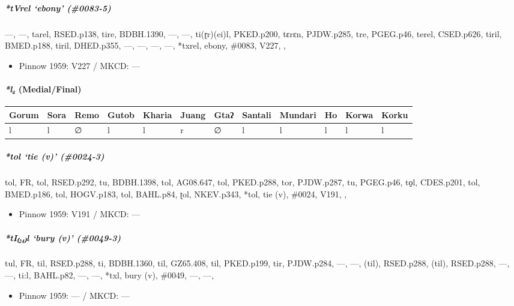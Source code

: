 \documentclass[a4paper,]{article}
\providecommand{\tightlist}{%
  \setlength{\itemsep}{0pt}\setlength{\parskip}{0pt}}
\let\oldparagraph\paragraph
\renewcommand{\paragraph}[1]{\oldparagraph{#1}\mbox{}}
\let\oldsubparagraph\subparagraph
\renewcommand{\subparagraph}[1]{\oldsubparagraph{#1}\mbox{}}
\begin{document}
\subparagraph{\texorpdfstring{\emph{*tVrel} `ebony'
(\#0083-5)}{*tVrel ebony (\#0083-5)}}\label{tvrel-ebony-0083-5}

---, ---, tarel, RSED.p138, tire, BDBH.1390, ---, ---, ti(ɽr)(ei)l,
PKED.p200, tɛrɛn, PJDW.p285, tre, PGEG.p46, terel, CSED.p626, tiril,
BMED.p188, tiril, DHED.p355, ---, ---, ---, ---, *txrel, ebony, \#0083,
V227, ,

\begin{itemize}
\tightlist
\item
  Pinnow 1959: V227 / MKCD: ---
\end{itemize}

\paragraph{\texorpdfstring{\emph{*l₄}
(Medial/Final)}{*l₄ (Medial/Final)}}\label{l-medialfinal-2}

\begin{longtable}[]{@{}llllllllllll@{}}
\toprule
Gorum & Sora & Remo & Gutob & Kharia & Juang & Gtaʔ & Santali & Mundari
& Ho & Korwa & Korku\tabularnewline
\midrule
\endhead
l & l & ∅ & l & l & r & ∅ & l & l & l & l & l\tabularnewline
\bottomrule
\end{longtable}

\subparagraph{\texorpdfstring{\emph{*tol} `tie (v)'
(\#0024-3)}{*tol tie (v) (\#0024-3)}}\label{tol-tie-v-0024-3}

tol, FR, tol, RSED.p292, tu, BDBH.1398, tol, AG08.647, tol, PKED.p288,
tor, PJDW.p287, tu, PGEG.p46, to̠l, CDES.p201, tol, BMED.p186, tol,
HOGV.p183, tol, BAHL.p84, ʈol, NKEV.p343, *tol, tie (v), \#0024, V191, ,

\begin{itemize}
\tightlist
\item
  Pinnow 1959: V191 / MKCD: ---
\end{itemize}

\subparagraph{\texorpdfstring{\emph{*tI₍₂₄₎l} `bury (v)'
(\#0049-3)}{*tI₍₂₄₎l bury (v) (\#0049-3)}}\label{til-bury-v-0049-3}

tul, FR, til, RSED.p288, ti, BDBH.1360, til, GZ65.408, til, PKED.p199,
tir, PJDW.p284, ---, ---, (til), RSED.p288, (til), RSED.p288, ---, ---,
ti:l, BAHL.p82, ---, ---, *txl, bury (v), \#0049, ---, ---,

\begin{itemize}
\tightlist
\item
  Pinnow 1959: --- / MKCD: ---
\end{itemize}
\end{document}
